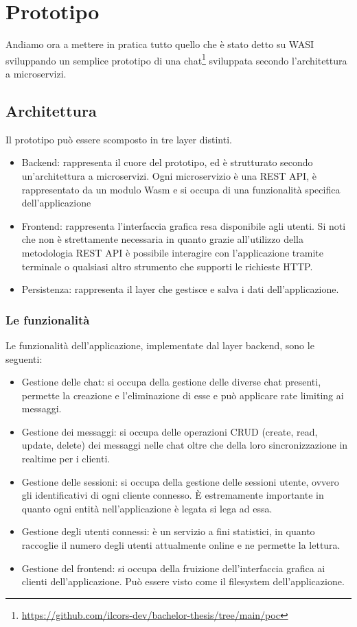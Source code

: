 \chapter{Prototipo}
Andiamo ora a mettere in pratica tutto quello che è stato detto su WASI sviluppando un semplice prototipo di una
chat\footnote{\url{https://github.com/ilcors-dev/bachelor-thesis/tree/main/poc}} sviluppata secondo l'architettura a
microservizi.

\section{Architettura}
Il prototipo può essere scomposto in tre layer distinti.

\begin{itemize}
    \item Backend: rappresenta il cuore del prototipo, ed è strutturato secondo un'architettura a microservizi. Ogni
    microservizio è una REST API, è rappresentato da un modulo Wasm e si occupa di una funzionalità specifica
    dell'applicazione
    \item Frontend: rappresenta l'interfaccia grafica resa disponibile agli utenti. Si noti che non è strettamente
    necessaria in quanto grazie all'utilizzo della metodologia REST API è possibile interagire con l'applicazione
    tramite terminale o qualsiasi altro strumento che supporti le richieste HTTP.
    \item Persistenza: rappresenta il layer che gestisce e salva i dati dell'applicazione.
\end{itemize}

\subsection{Le funzionalità}
Le funzionalità dell'applicazione, implementate dal layer backend, sono le seguenti:
\begin{itemize}
    \item Gestione delle chat: si occupa della gestione delle diverse chat presenti, permette la creazione e
    l'eliminazione di esse e può applicare rate limiting ai messaggi.
    \item Gestione dei messaggi: si occupa delle operazioni CRUD (create, read, update, delete) dei messaggi nelle chat
    oltre che della loro sincronizzazione in realtime per i clienti.
    \item Gestione delle sessioni: si occupa della gestione delle sessioni utente, ovvero gli identificativi di ogni
    cliente connesso. È estremamente importante in quanto ogni entità nell'applicazione è legata si lega ad essa.
    \item Gestione degli utenti connessi: è un servizio a fini statistici, in quanto raccoglie il numero degli utenti
    attualmente online e ne permette la lettura.
    \item Gestione del frontend: si occupa della fruizione dell'interfaccia grafica ai clienti dell'applicazione. Può
    essere visto come il filesystem dell'applicazione.
\end{itemize}

